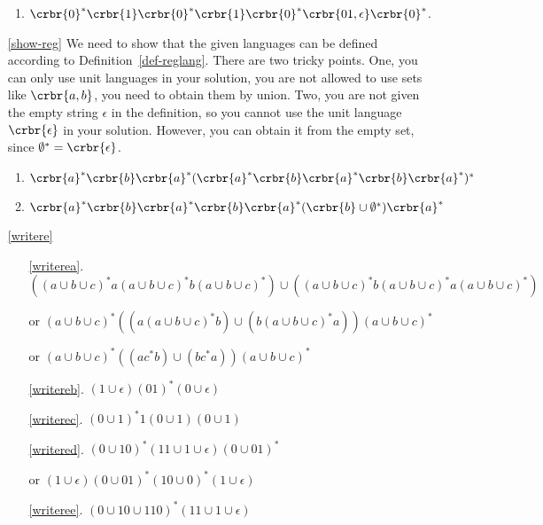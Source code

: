 \documentclass[11pt]{article}
\begin{document}
\begin{itemize}
\begin{enumerate}
\item $\crbr{0}^*\crbr{1}\crbr{0}^*\crbr{1}\crbr{0}^*\crbr{01,\epsilon}\crbr{0}^*$.

\end{enumerate}

\item[\ref{show-reg}] We need to show that the given languages can be defined
according to Definition~\ref{def-reglang}. There are two tricky points. One,
you can only use unit languages in your solution, you are not allowed to
use sets like $\crbr{a,b}$, you need to obtain them by union. Two,  you are not
given the empty string $\epsilon$ in the definition, so you cannot use the unit
language $\crbr{\epsilon}$  in your solution. However, you can obtain it from
the empty set, since $\emptyset^*=\crbr{\epsilon}$.

\begin{enumerate}
\item $\crbr{a}^*\crbr{b}\crbr{a}^*(\crbr{a}^*\crbr{b}\crbr{a}^*\crbr{b}\crbr{a}^*)^*$ 

\item $\crbr{a}^*\crbr{b}\crbr{a}^*\crbr{b}\crbr{a}^*(\crbr{b}\cup\emptyset^*)\crbr{a}^*$ 

\end{enumerate}


\item[\ref{writere}] \hypertarget{writeresol}{}
\begin{enumerate}
\item[\ref{writerea}.] $((a\cup b \cup c)^*a(a\cup b \cup c)^*b(a\cup b \cup c)^*) \cup ((a\cup b \cup c)^*b(a\cup b \cup c)^*a(a\cup b \cup c)^*)$

or $(a\cup b \cup c)^*((a(a\cup b \cup c)^*b) \cup (b(a\cup b \cup c)^*a))(a\cup b \cup c)^*$

or $(a\cup b \cup c)^*((ac^*b) \cup (bc^*a))(a\cup b \cup c)^*$
\item[\ref{writereb}.] $(1\cup\epsilon)(01)^*(0\cup\epsilon)$

\item[\ref{writerec}.] $(0\cup 1)^*1(0\cup 1)(0\cup 1)$

\item[\ref{writered}.] $(0\cup 10)^*(11\cup 1\cup \epsilon)(0\cup 01)^*$

or $(1\cup \epsilon)(0\cup 01)^*(10 \cup 0)^*(1\cup\epsilon)$

\item[\ref{writeree}.] $(0\cup 10 \cup 110)^*(11\cup 1\cup \epsilon)$


\end{enumerate}
\end{itemize}
\end{document}
